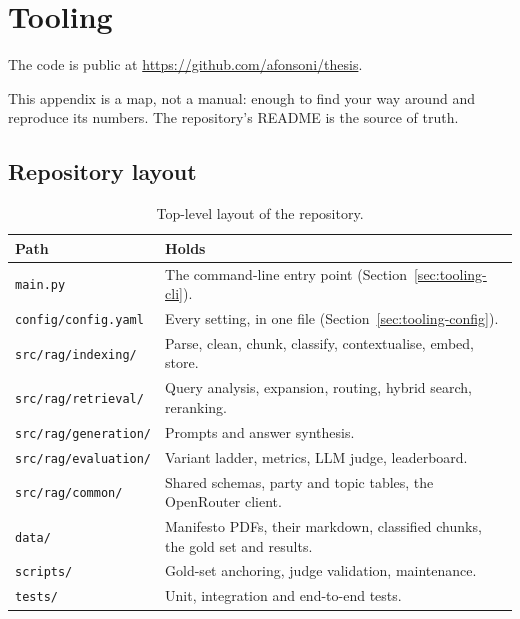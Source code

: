 \chapter{Tooling} \label{app:tooling}

The code is public at \url{https://github.com/afonsoni/thesis}.

This appendix is a map, not a manual: enough to find your way around \sysname{}
and reproduce its numbers. The repository's README is the source of truth.

\section{Repository layout} \label{sec:tooling-layout}

\begin{table}[h]
    \centering
    \small
    \begin{tabularx}{\textwidth}{|l|X|}
        \hline
        \textbf{Path} & \textbf{Holds} \\
        \hline
        \texttt{main.py} & The command-line entry point (Section~\ref{sec:tooling-cli}). \\
        \texttt{config/config.yaml} & Every setting, in one file (Section~\ref{sec:tooling-config}). \\
        \texttt{src/rag/indexing/} & Parse, clean, chunk, classify, contextualise, embed, store. \\
        \texttt{src/rag/retrieval/} & Query analysis, expansion, routing, hybrid search, reranking. \\
        \texttt{src/rag/generation/} & Prompts and answer synthesis. \\
        \texttt{src/rag/evaluation/} & Variant ladder, metrics, LLM judge, leaderboard. \\
        \texttt{src/rag/common/} & Shared schemas, party and topic tables, the OpenRouter client. \\
        \texttt{data/} & Manifesto PDFs, their markdown, classified chunks, the gold set and results. \\
        \texttt{scripts/} & Gold-set anchoring, judge validation, maintenance. \\
        \texttt{tests/} & Unit, integration and end-to-end tests. \\
        \hline
    \end{tabularx}
    \caption{Top-level layout of the \sysname{} repository.}
    \label{tab:tooling-layout}
\end{table}

